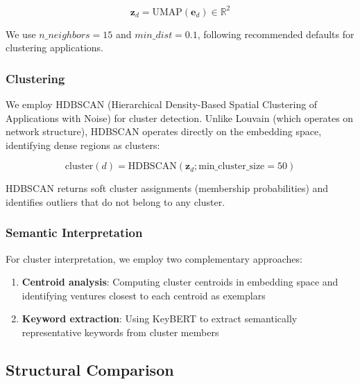 \documentclass[../main.tex]{subfiles}
\begin{document}
\begin{equation}
    \mathbf{z}_d = \text{UMAP}(\mathbf{e}_d) \in \mathbb{R}^{2}
\end{equation}

We use $n\_neighbors = 15$ and $min\_dist = 0.1$, following recommended defaults for clustering applications.

\subsubsection{Clustering}

We employ HDBSCAN (Hierarchical Density-Based Spatial Clustering of Applications with Noise) \cite{campello2013density} for cluster detection. Unlike Louvain (which operates on network structure), HDBSCAN operates directly on the embedding space, identifying dense regions as clusters:

\begin{equation}
    \text{cluster}(d) = \text{HDBSCAN}(\mathbf{z}_d; \text{min\_cluster\_size} = 50)
\end{equation}

HDBSCAN returns soft cluster assignments (membership probabilities) and identifies outliers that do not belong to any cluster.

\subsubsection{Semantic Interpretation}

For cluster interpretation, we employ two complementary approaches:

\begin{enumerate}
    \item \textbf{Centroid analysis}: Computing cluster centroids in embedding space and identifying ventures closest to each centroid as exemplars
    \item \textbf{Keyword extraction}: Using KeyBERT \cite{grootendorst2020keybert} to extract semantically representative keywords from cluster members
\end{enumerate}

\subsection{Structural Comparison}
\end{document}
